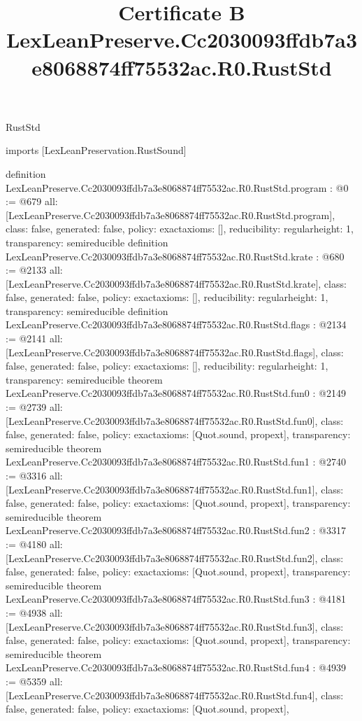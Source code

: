 \begin{lexlean}{RustStd}
\title{Certificate B LexLeanPreserve.Cc2030093ffdb7a3e8068874ff75532ac.R0.RustStd}
\begin{coremodule}
imports [LexLeanPreservation.RustSound]

definition LexLeanPreserve.Cc2030093ffdb7a3e8068874ff75532ac.R0.RustStd.program : @0 := @679 {
  all: [LexLeanPreserve.Cc2030093ffdb7a3e8068874ff75532ac.R0.RustStd.program],
  class: false,
  generated: false,
  policy: exact{axioms: []},
  reducibility: regular{height: 1},
  transparency: semireducible
}
definition LexLeanPreserve.Cc2030093ffdb7a3e8068874ff75532ac.R0.RustStd.krate : @680 := @2133 {
  all: [LexLeanPreserve.Cc2030093ffdb7a3e8068874ff75532ac.R0.RustStd.krate],
  class: false,
  generated: false,
  policy: exact{axioms: []},
  reducibility: regular{height: 1},
  transparency: semireducible
}
definition LexLeanPreserve.Cc2030093ffdb7a3e8068874ff75532ac.R0.RustStd.flags : @2134 := @2141 {
  all: [LexLeanPreserve.Cc2030093ffdb7a3e8068874ff75532ac.R0.RustStd.flags],
  class: false,
  generated: false,
  policy: exact{axioms: []},
  reducibility: regular{height: 1},
  transparency: semireducible
}
theorem LexLeanPreserve.Cc2030093ffdb7a3e8068874ff75532ac.R0.RustStd.fun0 : @2149 := @2739 {
  all: [LexLeanPreserve.Cc2030093ffdb7a3e8068874ff75532ac.R0.RustStd.fun0],
  class: false,
  generated: false,
  policy: exact{axioms: [Quot.sound, propext]},
  transparency: semireducible
}
theorem LexLeanPreserve.Cc2030093ffdb7a3e8068874ff75532ac.R0.RustStd.fun1 : @2740 := @3316 {
  all: [LexLeanPreserve.Cc2030093ffdb7a3e8068874ff75532ac.R0.RustStd.fun1],
  class: false,
  generated: false,
  policy: exact{axioms: [Quot.sound, propext]},
  transparency: semireducible
}
theorem LexLeanPreserve.Cc2030093ffdb7a3e8068874ff75532ac.R0.RustStd.fun2 : @3317 := @4180 {
  all: [LexLeanPreserve.Cc2030093ffdb7a3e8068874ff75532ac.R0.RustStd.fun2],
  class: false,
  generated: false,
  policy: exact{axioms: [Quot.sound, propext]},
  transparency: semireducible
}
theorem LexLeanPreserve.Cc2030093ffdb7a3e8068874ff75532ac.R0.RustStd.fun3 : @4181 := @4938 {
  all: [LexLeanPreserve.Cc2030093ffdb7a3e8068874ff75532ac.R0.RustStd.fun3],
  class: false,
  generated: false,
  policy: exact{axioms: [Quot.sound, propext]},
  transparency: semireducible
}
theorem LexLeanPreserve.Cc2030093ffdb7a3e8068874ff75532ac.R0.RustStd.fun4 : @4939 := @5359 {
  all: [LexLeanPreserve.Cc2030093ffdb7a3e8068874ff75532ac.R0.RustStd.fun4],
  class: false,
  generated: false,
  policy: exact{axioms: [Quot.sound, propext]},
}
\end{coremodule}
\end{lexlean}
